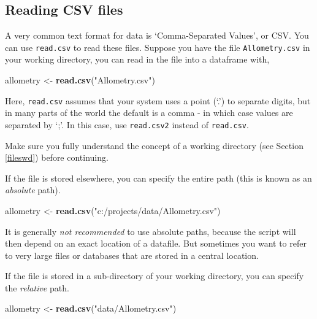 \documentclass[]{book}
\newenvironment{Shaded}{\begin{snugshade}}{\end{snugshade}}
\newcommand{\KeywordTok}[1]{\textcolor[rgb]{0.13,0.29,0.53}{\textbf{#1}}}
\newcommand{\NormalTok}[1]{#1}
\newcommand{\StringTok}[1]{\textcolor[rgb]{0.31,0.60,0.02}{#1}}
\begin{document}
\hypertarget{readcsv}{%
\subsection{Reading CSV files}\label{readcsv}}

A very common text format for data is `Comma-Separated Values', or CSV. You can use \texttt{read.csv} to read these files. Suppose you have the file \texttt{Allometry.csv} in your working directory, you can read in the file into a dataframe with,

\begin{Shaded}
\begin{Highlighting}[]
\NormalTok{allometry <-}\StringTok{ }\KeywordTok{read.csv}\NormalTok{(}\StringTok{"Allometry.csv"}\NormalTok{)}
\end{Highlighting}
\end{Shaded}

Here, \texttt{read.csv} assumes that your system uses a point (`.') to separate digits, but in many parts of the world the default is a comma - in which case values are separated by `;'. In this case, use \texttt{read.csv2} instead of \texttt{read.csv}.

Make sure you fully understand the concept of a working directory (see Section \ref{fileswd}) before continuing.

If the file is stored elsewhere, you can specify the entire path (this is known as an \emph{absolute} path).

\begin{Shaded}
\begin{Highlighting}[]
\NormalTok{allometry <-}\StringTok{ }\KeywordTok{read.csv}\NormalTok{(}\StringTok{"c:/projects/data/Allometry.csv"}\NormalTok{)}
\end{Highlighting}
\end{Shaded}

It is generally \emph{not recommended} to use absolute paths, because the script will then depend on an exact location of a datafile. But sometimes you want to refer to very large files or databases that are stored in a central location.

If the file is stored in a sub-directory of your working directory, you can specify the \emph{relative} path.

\begin{Shaded}
\begin{Highlighting}[]
\NormalTok{allometry <-}\StringTok{ }\KeywordTok{read.csv}\NormalTok{(}\StringTok{"data/Allometry.csv"}\NormalTok{)}
\end{Highlighting}
\end{Shaded}
\end{document}
